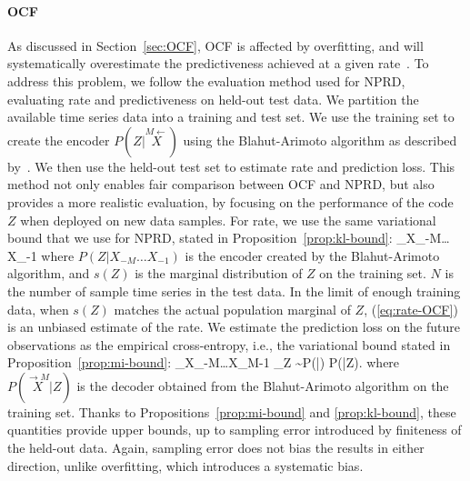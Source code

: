 \documentclass[entropy,article,submit,moreauthors,pdftex,10pt,a4paper]{Definitions/mdpi}
\newcommand{\E}[0]{\mathbb{E}}
\newcommand{\finitefuture}{\stackrel{\rightarrow \scriptscriptstyle{M}}{X}}
\newcommand{\finitepast}{\stackrel{\scriptscriptstyle{M}\leftarrow}{X}}%
\let\oldequation\equation
\let\oldendequation\endequation
\renewenvironment{equation}
  {\linenomathNonumbers\oldequation}
  {\oldendequation\endlinenomath}
\begin{document}
\paragraph{OCF} As discussed in Section~\ref{sec:OCF}, OCF is affected by overfitting, 
and will systematically overestimate the predictiveness achieved at a given rate~\citep{still-optimal-2010}.
To address this problem, we follow the evaluation method used for NPRD, evaluating rate and predictiveness on held-out test data.
We partition the available time series data into a training and test set. We use the training set to create the encoder $P(Z|\finitepast)$ using the Blahut-Arimoto algorithm as described by~\citet{still-optimal-2010}.
We then use the held-out test set to estimate rate and prediction loss.
This method not only enables fair comparison between OCF and NPRD, but also provides a more realistic evaluation, by focusing on the performance of the code $Z$ when deployed on new data samples.
For rate, we use the same variational bound that we use for NPRD, stated in Proposition~\ref{prop:kl-bound}:
\begin{equation}\label{eq:rate-OCF}
 \sum_{X_{-M}\dots X_{-1} \in {}} 
\end{equation}
where $P(Z|X_{-M}\dots X_{-1})$ is the encoder created by the Blahut-Arimoto algorithm, and $s(Z)$ is the marginal distribution of $Z$ on the training set.
$N$ is the number of sample time series in the test data.
In the limit of enough training data, when $s(Z)$ matches the actual population marginal of $Z$, (\ref{eq:rate-OCF}) is an unbiased estimate of the rate. %
We estimate the prediction loss on the future observations as the empirical cross-entropy, i.e., the variational bound stated in Proposition~\ref{prop:mi-bound}:
\begin{equation}
 \sum_{X_{-M}\dots X_{M-1} \in {}} \E_{Z \sim P(\cdot|\finitepast)} \log P(\finitefuture|Z).
\end{equation}
where $P(\finitefuture|Z)$ is the decoder obtained from the Blahut-Arimoto algorithm on the training set.
Thanks to Propositions~\ref{prop:mi-bound} and \ref{prop:kl-bound}, these quantities provide upper bounds, up to sampling error introduced by finiteness of the held-out data.
Again, sampling error does not bias the results in either direction, unlike overfitting, which introduces a systematic bias.
\end{document}
